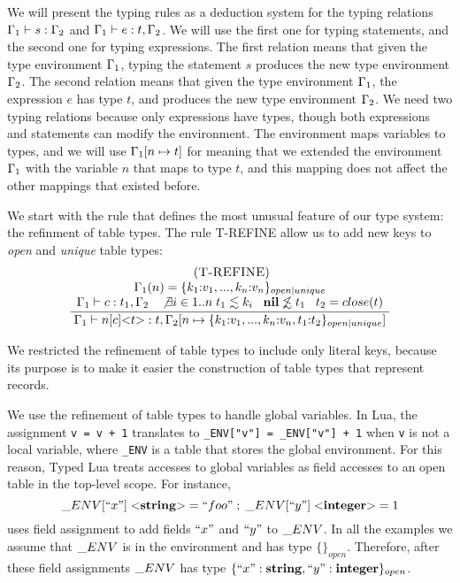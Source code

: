 We will present the typing rules as a deduction system for the typing
relations $\Gamma_{1} \vdash s : \Gamma_{2}$ and $\Gamma_{1} \vdash e : t, \Gamma_{2}$. 
We will use the first one for typing statements, and the second one
for typing expressions.
The first relation means that given the type environment $\Gamma_{1}$,
typing the statement $s$ produces the new type environment $\Gamma_{2}$. 
The second relation means that given the type environment $\Gamma_{1}$,
the expression $e$ has type $t$, and produces the new type environment $\Gamma_{2}$.
We need two typing relations because only expressions have types,
though both expressions and statements can modify the environment.
The environment maps variables to types, and we will use $\Gamma_{1}[n \mapsto t]$
for meaning that we extended the environment $\Gamma_{1}$ with the
variable $n$ that maps to type $t$, and this mapping does not affect
the other mappings that existed before.

We start with the rule that defines the most unusual feature of
our type system: the refinment of table types.
The rule \textsc{T-REFINE} allow us to add new keys to \emph{open}
and \emph{unique} table types:
\[
\begin{array}{c}
\; (\textsc{T-REFINE})\\
\dfrac{\begin{array}{c}
       \Gamma_{1}(n) = \{ k_{1}{:}v_{1}, ..., k_{n}{:}v_{n} \}_{open|unique}\\
       \Gamma_{1} \vdash c:t_{1}, \Gamma_{2} \;\;\;
       \not \exists i \in 1..n \; t_{1} \lesssim k_{i} \;\;\;
       \mathbf{nil} \not\lesssim t_{1} \;\;\;
       t_{2} = close(t)
       \end{array}}
      {\Gamma_{1} \vdash n[c] {<}t{>}:t, \Gamma_{2}[n \mapsto \{ k_{1}{:}v_{1}, ..., k_{n}{:}v_{n}, t_{1}{:}t_{2}\}_{open|unique}]}
\end{array}
\]

We restricted the refinement of table types to include only literal
keys, because its purpose is to make it easier the construction of
table types that represent records.

We use the refinement of table types to handle global variables.
In Lua, the assignment \texttt{v = v + 1} translates to
\texttt{\string_ENV["v"] = \string_ENV["v"] + 1} when \texttt{v}
is not a local variable, where \texttt{\string_ENV} is a table
that stores the global environment.
For this reason, Typed Lua treats accesses to global variables as field accesses
to an open table in the top-level scope.
For instance,
\[
\string_ENV[``x"] \; {<}\String{>} = ``foo" \;;\; \string_ENV[``y"] \; {<}\Integer{>} = 1
\]
uses field assignment to add fields $``x"$ and $``y"$ to $\string_ENV$.
In all the examples we assume that $\string_ENV$ is in the environment and
has type $\{\}_{open}$.
Therefore, after these field assignments $\string_ENV$ has type
$\{``x":\mathbf{string}, ``y":\mathbf{integer}\}_{open}$.

